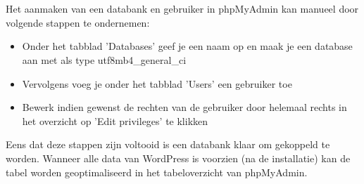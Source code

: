 \\\\
Het aanmaken van een databank en gebruiker in phpMyAdmin kan manueel door volgende stappen te ondernemen:
\begin{itemize}
    \item Onder het tabblad 'Databases' geef je een naam op en maak je een database aan met als type utf8mb4\_general\_ci
    \item Vervolgens voeg je onder het tabblad 'Users' een gebruiker toe
    \item Bewerk indien gewenst de rechten van de gebruiker door helemaal rechts in het overzicht op 'Edit privileges' te klikken
\end{itemize}
Eens dat deze stappen zijn voltooid is een databank klaar om gekoppeld te worden. Wanneer alle data van WordPress is voorzien (na de installatie) kan de tabel worden geoptimaliseerd in het tabeloverzicht van phpMyAdmin.
